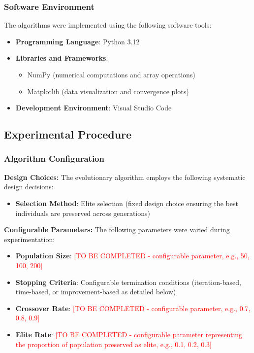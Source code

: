 \documentclass{scrartcl}
\begin{document}
\subsubsection{Software Environment}
The algorithms were implemented using the following software tools:
\begin{itemize}
    \item \textbf{Programming Language}: Python 3.12
    \item \textbf{Libraries and Frameworks}: 
    \begin{itemize}
        \item NumPy (numerical computations and array operations)
        \item Matplotlib (data visualization and convergence plots)
    \end{itemize}
    \item \textbf{Development Environment}: Visual Studio Code
\end{itemize}

\subsection{Experimental Procedure}

\subsubsection{Algorithm Configuration}

\textbf{Design Choices:}
The evolutionary algorithm employs the following systematic design decisions:
\begin{itemize}
    \item \textbf{Selection Method}: Elite selection (fixed design choice ensuring the best individuals are preserved across generations)
\end{itemize}

\textbf{Configurable Parameters:}
The following parameters were varied during experimentation:
\begin{itemize}
    \item \textbf{Population Size}: \textcolor{red}{[TO BE COMPLETED - configurable parameter, e.g., 50, 100, 200]}
    \item \textbf{Stopping Criteria}: Configurable termination conditions (iteration-based, time-based, or improvement-based as detailed below)
    \item \textbf{Crossover Rate}: \textcolor{red}{[TO BE COMPLETED - configurable parameter, e.g., 0.7, 0.8, 0.9]}
    \item \textbf{Elite Rate}: \textcolor{red}{[TO BE COMPLETED - configurable parameter representing the proportion of population preserved as elite, e.g., 0.1, 0.2, 0.3]}
\end{itemize}
\end{document}
